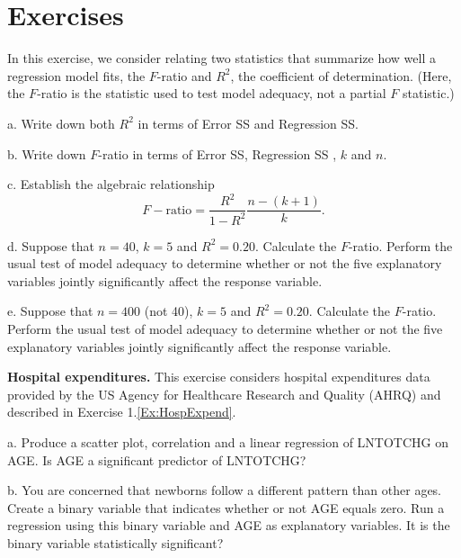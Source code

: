 \section{Exercises}


\begin{exercises}

\item In this exercise, we consider relating two statistics that summarize how well a regression model fits,
the $F$-ratio and $R^2$, the coefficient of determination. (Here,
the $F$-ratio is the statistic used to test model adequacy, not a
partial $F$ statistic.)

a.  Write down both $R^2$ in terms of Error SS and Regression SS.

b. Write down $F$-ratio in terms of Error SS, Regression SS , $k$
and $n$.

c. Establish the algebraic relationship
\begin{equation*}
F-\textrm{ratio} = \frac{R^2}{1-R^2} \frac{n-(k+1)}{k}.
\end{equation*}

d.  Suppose that $n = 40$, $k = 5$ and $R^2 = 0.20$. Calculate the
$F$-ratio. Perform the usual test of model adequacy to determine
whether or not the five explanatory variables jointly significantly
affect the response variable.

e.  Suppose that $n = 400$ (not 40), $k = 5$ and $R^2 = 0.20$.
Calculate the $F$-ratio. Perform the usual test of model adequacy to
determine whether or not the five explanatory variables jointly
significantly affect the response variable.


\item \textbf{Hospital expenditures.}\label{Ex:HospExpend4} This exercise considers
hospital expenditures data provided by the US Agency for Healthcare
Research and Quality (AHRQ) and described in Exercise
1.\ref{Ex:HospExpend}.

a. Produce a scatter plot, correlation and a linear regression of
LNTOTCHG on AGE. Is AGE a significant predictor of LNTOTCHG?

b. You are concerned that newborns follow a different pattern than
other ages. Create a binary variable that indicates whether or not
AGE equals zero. Run a regression using this binary variable and AGE
as explanatory variables. It is the binary variable statistically
significant?


\end{exercises}
